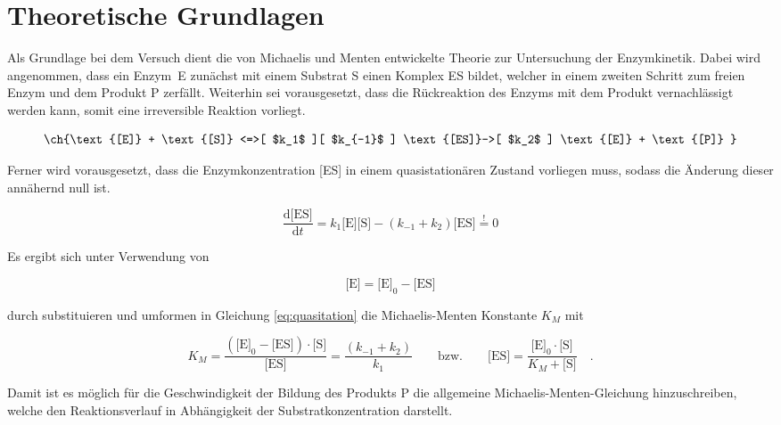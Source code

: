 \setlength\abovedisplayshortskip{20pt}
\setlength\belowdisplayshortskip{20pt}
\setlength\abovedisplayskip{20pt}
\setlength\belowdisplayskip{20pt}

\section{Theoretische Grundlagen \cite{wedler} }

Als Grundlage bei dem Versuch dient die von Michaelis und Menten entwickelte Theorie zur Untersuchung der Enzymkinetik. Dabei wird angenommen, dass ein Enzym~E zunächst mit einem Substrat S einen Komplex ES bildet, welcher in einem zweiten Schritt zum freien Enzym und dem Produkt P zerfällt. Weiterhin sei vorausgesetzt, dass die Rückreaktion des Enzyms mit dem Produkt vernachlässigt werden kann, somit eine irreversible Reaktion vorliegt. 

\begin{equation}
\ch{\text{[E]} + \text{[S]} <=>[ $k_1$ ][ $k_{-1}$ ] \text{[ES]}->[ $k_2$ ] \text{[E]} + \text{[P]} }
\end{equation}


Ferner wird vorausgesetzt, dass die Enzymkonzentration [ES] in einem quasistationären Zustand vorliegen muss, sodass die Änderung dieser annähernd null ist.

\begin{equation}
\frac{\text{d[ES]}}{\text{d}t} = k_1\text{[E][S]}-\left(k_{-1} + k_2\right)\text{[ES]} \stackrel{!}{=} 0
\label{eq:quasitation}
\end{equation}

Es ergibt sich unter Verwendung von

\begin{equation}
\text{[E]} = \text{[E]}_0-\text{[ES]}
\end{equation}

durch substituieren und umformen in Gleichung \ref{eq:quasitation}  die Michaelis-Menten Konstante $K_M$ mit

\begin{equation}
K_M=\frac{\left(\text{[E]}_0-\text{[ES]}\right)\cdot \text{[S]}}{\text{[ES]}}=\frac{\left(k_{-1} + k_2\right)}{k_1}\quad\quad\text{bzw.}\quad\quad 
\text{[ES]}=\frac{\text{[E]}_0\cdot \text{[S]}}{K_M+\text{[S]}} \quad\text{.}
\label{eq:MMkonstante}
\end{equation}

Damit ist es möglich für die Geschwindigkeit der Bildung des Produkts P die allgemeine Michaelis-Menten-Gleichung hinzuschreiben, welche den Reaktionsverlauf in Abhängigkeit der Substratkonzentration darstellt.

